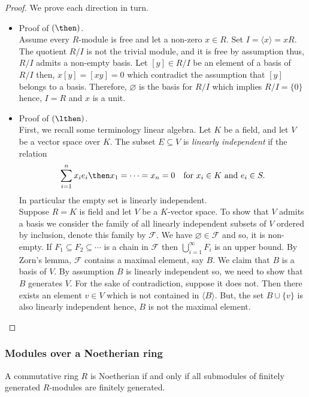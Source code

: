 \documentclass[12pt, a4paper]{article}
\begin{document}
\begin{proof}
    We prove each direction in turn.
    \begin{itemize}
        \item Proof of \((\then)\).\\
        Assume every \(R\)-module is free and let a non-zero \(x\in R\). Set \(I = \langle x \rangle =xR\). The quotient \(R/I\) is not the trivial module, and it is free by assumption thus, \(R/I\) admits a non-empty basis. Let \([y] \in R/I\) be an element of a basis of \(R/I\) then, \(x[y]=[xy]=0\) which contradict the assumption that \([y]\) belongs to a basis. Therefore, \(\varnothing\) is the basis for \(R/I\) which implies \(R/I = \{0\}\) hence, \(I=R\) and \(x\) is a unit.
        \item Proof of \((\lthen)\).\\  
        First, we recall some terminology linear algebra. Let \(K\) be a field, and let \(V\) be a vector space over \(K\). The subset \(E \subseteq V\) is \textit{linearly independent} if the relation 
        \[\sum_{i=1}^n x_i e_i \then x_1=\cdots=x_n=0 \quad \text{for } x_i\in K \text{ and } e_i \in S.\]
        In particular the empty set is linearly independent. \\
        Suppose \(R=K\) is field and let \(V\) be a \(K\)-vector space. To show that \(V\) admits a basis we consider the family of all linearly independent subsets of \(V\) ordered by inclusion, denote this family by \(\mathcal{F}\). We have \(\varnothing \in \mathcal{F}\) and so, it is non-empty. If \(F_1 \subseteq F_2 \subseteq \cdots\) is a chain in \(\mathcal{F}\) then \(\bigcup_{i=1}^{\infty} F_i\) is an upper bound. By Zorn's lemma, \(\mathcal{F}\) contains a maximal element, say \(B\). We claim that \(B\) is a basis of \(V\). By assumption \(B\) is linearly independent so, we need to show that \(B\) generates \(V\). For the sake of contradiction, suppose it does not. Then there exists an element \(v \in V\) which is not contained in \(\langle B \rangle\). But, the set \(B\cup \{v\}\) is also linearly independent hence, \(B\) is not the maximal element.
    \end{itemize}
\end{proof}

\subsubsection{Modules over a Noetherian ring}

\begin{mdthm}
    A commutative ring \(R\) is Noetherian if and only if all submodules of finitely generated \(R\)-modules are finitely generated.
\end{mdthm}
\end{document}
